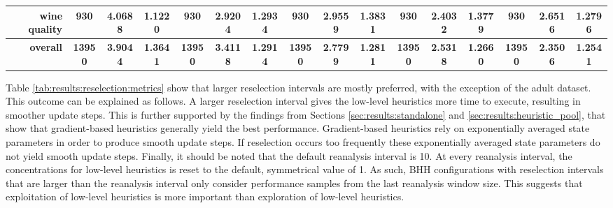 \begin{table}[H]
{\begin{tabular}{rccccccccccccccc}
			wine quality                        & 930                                      & 4.0688                                                                    & 1.1220          & 930                            & 2.9204          & 1.2934          & 930                             & 2.9559          & 1.3831          & 930                             & \cellcolor[rgb]{ .776,  .937,  .808}\textcolor[rgb]{ 0,  .38,  0}{2.4032} & 1.3779          & 930                             & 2.6516                                                                             & 1.2796          \\
			\midrule
			\textbf{overall}                    & \textbf{13950}                           & \textbf{3.9044}                                                           & \textbf{1.3641} & \textbf{13950}                 & \textbf{3.4118} & \textbf{1.2914} & \textbf{13950}                  & \textbf{2.7799} & \textbf{1.2811} & \textbf{13950}                  & \textbf{2.5318}                                                           & \textbf{1.2660} & \textbf{13950}                  & \cellcolor[rgb]{ .776,  .937,  .808}\textcolor[rgb]{ 0,  .38,  0}{\textbf{2.3506}} & \textbf{1.2541} \\
		\end{tabular}%
	}
\end{table}%

Table \ref{tab:results:reselection:metrics} show that larger reselection intervals are mostly preferred, with the exception of the adult dataset. This outcome can be explained as follows. A larger reselection interval gives the low-level heuristics more time to execute, resulting in smoother update steps. This is further supported by the findings from Sections \ref{sec:results:standalone} and \ref{sec:results:heuristic_pool}, that show that gradient-based heuristics generally yield the best performance. Gradient-based heuristics rely on exponentially averaged state parameters in order to produce smooth update steps. If reselection occurs too frequently these exponentially averaged state parameters do not yield smooth update steps. Finally, it should be noted that the default reanalysis interval is 10. At every reanalysis interval, the concentrations for low-level heuristics is reset to the default, symmetrical value of 1. As such, \acs{BHH} configurations with reselection intervals that are larger than the reanalysis interval only consider performance samples from the last reanalysis window size. This suggests that exploitation of low-level heuristics is more important than exploration of low-level heuristics.

